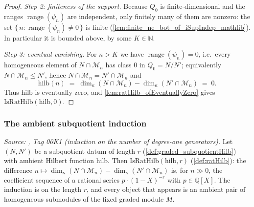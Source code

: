 \begin{proof}
  \emph{Step 2: finiteness of the support.} Because \(Q_0\) is finite-dimensional and
  the ranges \(\operatorname{range}(\psi_n)\) are independent, only finitely many of
  them are nonzero: the set \(\{\,n : \operatorname{range}(\psi_n) \ne 0\,\}\) is
  finite (\cref{lem:finite_ne_bot_of_iSupIndep_mathlib}). In particular it is bounded
  above, by some \(K \in \mathbb{N}\).

  \emph{Step 3: eventual vanishing.} For \(n > K\) we have
  \(\operatorname{range}(\psi_n) = 0\), i.e.\ every homogeneous element of
  \(N \cap \mathcal{M}_n\) has class \(0\) in \(Q_0 = N/N'\); equivalently
  \(N \cap \mathcal{M}_n \le N'\), hence \(N \cap \mathcal{M}_n = N' \cap \mathcal{M}_n\)
  and
  \[
    \mathrm{hilb}(n) \;=\; \dim_\kappa(N \cap \mathcal{M}_n)
      - \dim_\kappa(N' \cap \mathcal{M}_n) \;=\; 0 .
  \]
  Thus \(\mathrm{hilb}\) is eventually zero, and
  \cref{lem:ratHilb_ofEventuallyZero} gives \(\mathrm{IsRatHilb}(\mathrm{hilb}, 0)\).
\end{proof}

\subsubsection*{The ambient subquotient induction}

\begin{lemma}\leanok
  \label{lem:graded_subquotient_isRatHilb}
  \textit{Source: \cite{stacks-project}, Tag 00K1 (induction on the number of
  degree-one generators).}
  Let \((N, N')\) be a subquotient datum of length \(r\)
  (\cref{def:graded_subquotientHilb}) with ambient Hilbert function
  \(\mathrm{hilb}\). Then \(\mathrm{IsRatHilb}(\mathrm{hilb}, r)\)
  (\cref{def:ratHilb}): the difference \(n \mapsto \dim_\kappa(N \cap \mathcal{M}_n)
  - \dim_\kappa(N' \cap \mathcal{M}_n)\) is, for \(n \gg 0\), the coefficient
  sequence of a rational series \(p \cdot (1 - X)^{-r}\) with \(p \in
  \mathbb{Q}[X]\). The induction is on the length \(r\), and every object that
  appears is an ambient pair of homogeneous submodules of the fixed graded module
  \(M\).
\end{lemma}

